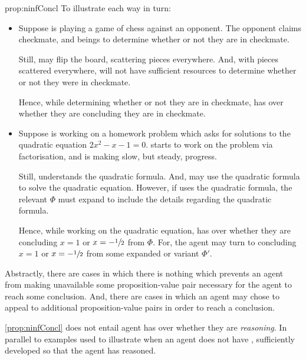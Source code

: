 \begin{note}
\begin{argument}{prop:ninfConcl}
    To illustrate each way in turn:

    \begin{itemize}
    \item
      Suppose \vAgent{} is playing a game of chess against an opponent.
      The opponent claims checkmate, and \vAgent{} beings to determine whether or not they are in checkmate.

      Still, \vAgent{} may flip the board, scattering pieces everywhere.
      And, with pieces scattered everywhere, \vAgent{} will not have sufficient resources to determine whether or not they were in checkmate.

      Hence, while determining whether or not they are in checkmate, \vAgent{} has \ninf{} over whether they are concluding they are in checkmate.
    \end{itemize}

    \begin{itemize}
    \item
      Suppose \vAgent{} is working on a homework problem which asks for solutions to the quadratic equation \(2x^{2} - x - 1 = 0\).
      \vAgent{} starts to work on the problem via factorisation, and is making slow, but steady, progress.

      Still, \vAgent{} understands the quadratic formula.
      And, \vAgent{} may use the quadratic formula to solve the quadratic equation.
      However, if \vAgent{} uses the quadratic formula, the relevant \poP{} \(\Phi\) must expand to include the details regarding the quadratic formula.

      Hence, while working on the quadratic equation, \vAgent{} has \ninf{} over whether they are concluding \(x = 1\) or \(x = -\sfrac{1}{2}\) from \(\Phi\).
      For, the agent may turn to concluding \(x = 1\) or \(x = -\sfrac{1}{2}\) from some expanded or variant \poP{} \(\Phi'\).
    \end{itemize}
  \end{argument}

  Abstractly, there are cases in which there is nothing which prevents an agent from making unavailable some proposition-value pair necessary for the agent to reach some conclusion.
  And, there are cases in which an agent may chose to appeal to additional proposition-value pairs in order to reach a conclusion.
\end{note}

\begin{note}
  \autoref{prop:ninfConcl} does not entail agent has \ninf{} over whether they are \emph{reasoning}.
  In parallel to examples used to illustrate when an agent does not have \ninf{}, sufficiently developed so that the agent has reasoned.
\end{note}

